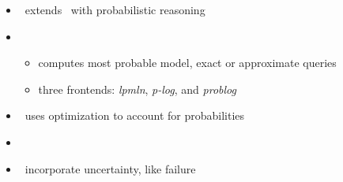 \begin{frame}{\plingo}
  \begin{itemize}
  \item {} \ extends \clingo\ with probabilistic reasoning
  \item {}
  \begin{itemize}
  \item computes most probable model, exact or approximate queries
  \item three frontends: \textit{lpmln}, \textit{p-log}, and \textit{problog}
  \end{itemize}
  \item {}   \  uses optimization to account for probabilities
  \item {}   \ \cite{hajakarorusc22a}
  \item {} \ incorporate uncertainty, like failure
  \end{itemize}
\end{frame}
%
